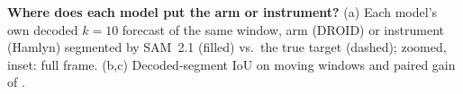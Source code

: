\textbf{Where does each model put the arm or instrument?} (a) Each model's own decoded $k{=}10$ forecast of the same window, arm (DROID) or instrument (Hamlyn) segmented by SAM~2.1 (filled) vs.\ the true target (dashed); zoomed, inset: full frame. (b,c) Decoded-segment IoU on moving windows and paired gain of \ours{}.
